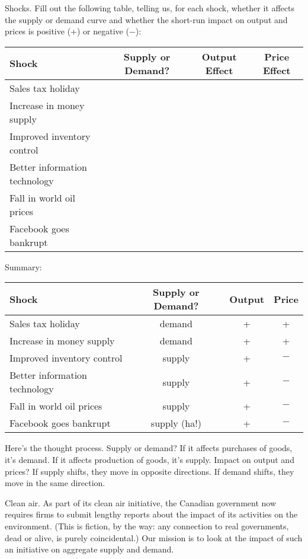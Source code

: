 \documentclass[12pt]{exam}
\begin{document}
\begin{questions}
\question Shocks.
Fill out the following table,
telling us, for each shock,
whether it affects the supply or demand curve
and whether the short-run impact on
output and prices is positive (+) or negative ($-$):

{\small
\begin{center}
\begin{tabular}{lccc}
\toprule
Shock        &  Supply or Demand?  &  Output Effect & Price Effect \\
\midrule
Sales tax holiday \\
Increase in money supply \\
Improved inventory control \\
Better information technology \\
Fall in world oil prices \\
Facebook goes bankrupt \\
\bottomrule
\end{tabular}
\end{center}
}
\smallskip

\begin{solution}
Summary:  

{\small
\begin{center}
\begin{tabular}{lccc}
\toprule
Shock        &  Supply or Demand?  &  Output & Price  \\
\midrule
Sales tax holiday &  demand  & + & + \\
Increase in money supply  & demand & + & + \\
Improved inventory control &  supply & + & $-$ \\
Better information technology & supply & + & $-$ \\
Fall in world oil prices    & supply &  + & $-$ \\
Facebook goes bankrupt      &  supply (ha!) & + & $-$ \\
\bottomrule
\end{tabular}
\end{center}
}
Here's the thought process.
Supply or demand?  If it affects purchases of goods, it's demand.
If it affects production of goods, it's supply.
Impact on output and prices?
If supply shifts, they move in opposite directions.
If demand shifts, they move in the same direction.
\end{solution}


\question Clean air.
As part of its clean air initiative,
the Canadian government now requires firms to submit lengthy reports
about the impact of its activities on the environment.
(This is fiction, by the way:  any connection to real governments,
dead or alive, is purely coincidental.)
Our mission is to look at the impact of such an initiative
on aggregate supply and demand.


\end{questions}
\end{document}
